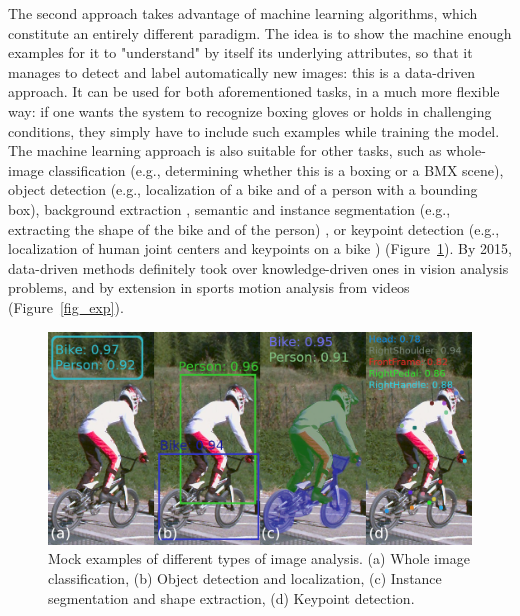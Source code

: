 
The second approach takes advantage of machine learning algorithms, which constitute an entirely different paradigm. The idea is to show the machine enough examples for it to "understand" by itself its underlying attributes, so that it manages to detect and label automatically new images: this is a data-driven approach. It can be used for both aforementioned tasks, in a much more flexible way: if one wants the system to recognize boxing gloves or holds in challenging conditions, they simply have to include such examples while training the model. The machine learning approach is also suitable for other tasks, such as whole-image classification (e.g., determining whether this is a boxing or a BMX scene), object detection (e.g., localization of a bike and of a person with a bounding box), background extraction \cite{Bouwmans2019}, semantic and instance segmentation (e.g., extracting the shape of the bike and of the person) \cite{Minaee2021}, or keypoint detection (e.g., localization of human joint centers and keypoints on a bike \cite{Chen2020}) (Figure~\ref{fig_classif_detec}). By 2015, data-driven methods definitely took over knowledge-driven ones in vision analysis problems, and by extension in sports motion analysis from videos (Figure~\ref{fig_exp}).

\clearpage
\begin{figure}[!ht]
	\centering
	\def\svgwidth{1\columnwidth}
	\fontsize{10pt}{10pt}\selectfont
	\includegraphics[width=\linewidth]{"../Chap2/Figures/Fig_classif_detec.png"}
	\caption{Mock examples of different types of image analysis. (a) Whole image classification, (b) Object detection and localization, (c) Instance segmentation and shape extraction, (d) Keypoint detection.}
	\label{fig_classif_detec}
\end{figure}

